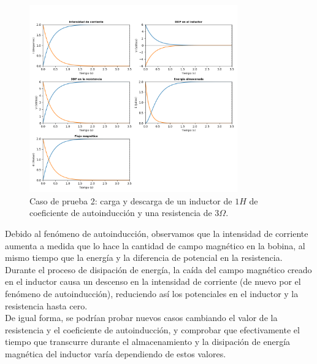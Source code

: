 \documentclass[../main.tex]{subfiles}
\begin{document}
\begin{figure}[!h]
    \centering
    \includegraphics[width=0.8\textwidth]{images/caso_prueba_rl_1.png}
    \caption{Caso de prueba 2: carga y descarga de un inductor de $1H$ de coeficiente de autoinducción y una resistencia de $3 \Omega$.}
    \label{fig::caso_prueba_rl_1_res}
\end{figure}

Debido al fenómeno de autoinducción, observamos que la intensidad de corriente aumenta a medida que lo hace la cantidad de campo magnético en la bobina, al mismo tiempo que la energía y la diferencia de potencial en la resistencia. Durante el proceso de disipación de energía, la caída del campo magnético creado en el inductor causa un descenso en la intensidad de corriente (de nuevo por el fenómeno de autoinducción), reduciendo así los potenciales en el inductor y la resistencia hasta cero. \\

De igual forma, se podrían probar nuevos casos cambiando el valor de la resistencia y el coeficiente de autoinducción, y comprobar que efectivamente el tiempo que transcurre durante el almacenamiento y la disipación de energía magnética del inductor varía dependiendo de estos valores.\\
\end{document}
